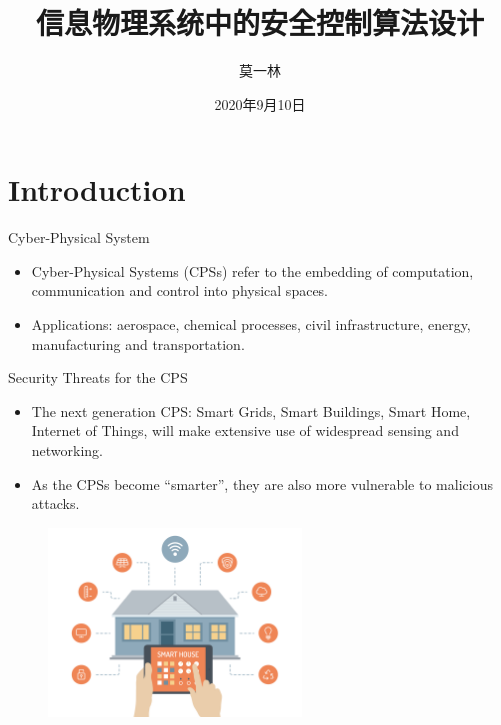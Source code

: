 \documentclass[10pt]{beamer}
\title[Secure CPS]{信息物理系统中的安全控制算法设计}
\author[Yilin Mo]{莫一林}
\institute[Tsinghua]{清华大学    自动化系}
\date[Sept 10th, 2020]{2020年9月10日}
\begin{document}
\maketitle 

\section{Introduction}

\begin{frame}{Cyber-Physical System}
  \begin{itemize}
  \item Cyber-Physical Systems (CPSs) refer to the embedding of computation, communication and control into physical spaces.
    \begin{center}
    \end{center}
  \item Applications: aerospace, chemical processes, civil infrastructure, energy, manufacturing and transportation. 
  \end{itemize}
\end{frame}

\begin{frame}{Security Threats for the CPS}
  \begin{itemize}
  \item The next generation CPS: Smart Grids, Smart Buildings, Smart Home, Internet of Things, will make extensive use of widespread sensing and networking.
  \item As the CPSs become ``smarter'', they are also more vulnerable to malicious attacks.
  \end{itemize}
  \begin{figure}[ht]
    \centering
    \includegraphics[width=0.6\textwidth]{SmartHome.jpg}
  \end{figure}
\end{frame}
\end{document}
